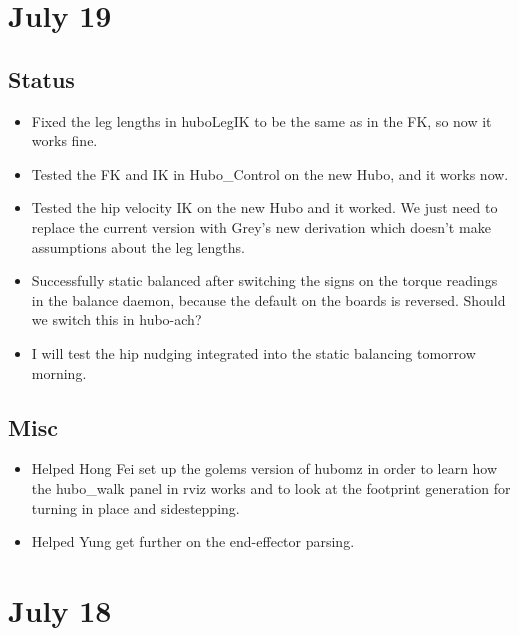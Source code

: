 \documentclass[letterpaper, 10 pt]{report}
\begin{document}
\section*{July 19}
\subsection*{Status}
\begin{itemize}
\item Fixed the leg lengths in huboLegIK to be the same as in the FK, so now it works fine.
\item Tested the FK and IK in Hubo\_Control on the new Hubo, and it works now.
\item Tested the hip velocity IK on the new Hubo and it worked. We just need to replace the current version with Grey's new derivation which doesn't make assumptions about the leg lengths.
\item Successfully static balanced after switching the signs on the torque readings in the balance daemon, because the default on the boards is reversed.
\newline Should we switch this in hubo-ach?
\item I will test the hip nudging integrated into the static balancing tomorrow morning.
\end{itemize}
\subsection*{Misc}
\begin{itemize}
\item Helped Hong Fei set up the golems version of hubomz in order to learn how the hubo\_walk panel in rviz works and to look at the footprint generation for turning in place and sidestepping.
\item Helped Yung get further on the end-effector parsing.
\end{itemize}

\section*{July 18}
\end{document}
